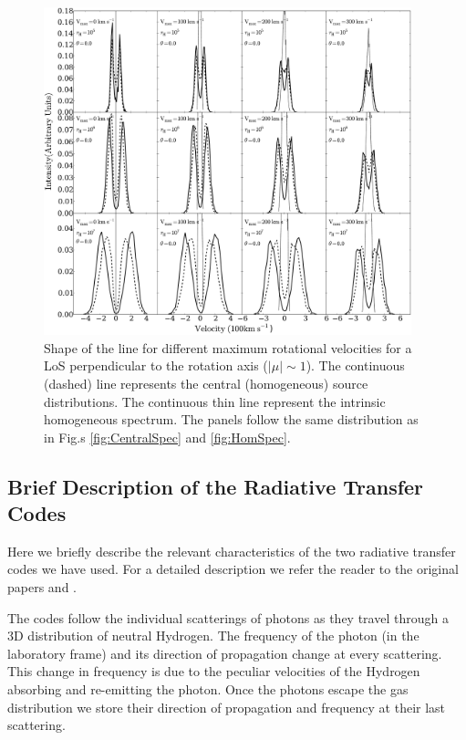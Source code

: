 \documentclass{emulateapj}
\newcommand{\ly}{{\ifmmode{{\rm Ly}\alpha~}\else{Ly$\alpha$~}\fi}}
\begin{document}
\begin{figure}
\begin{center}
  \includegraphics[width=0.95\textwidth]{f4-2.pdf}
\end{center}
\caption{Shape of the \ly line for different maximum rotational
  velocities for a LoS perpendicular to the rotation axis
  ($|\mu|\sim 1$). The continuous (dashed) line represents the central
  (homogeneous) source distributions.  The continuous thin line
represent the intrinsic homogeneous spectrum. The panels follow the same
  distribution as in Fig.s \ref{fig:CentralSpec} and \ref{fig:HomSpec}.
    \label{fig:differentvelocities2}}
\end{figure}


\subsection{Brief Description of the Radiative Transfer Codes}

Here we briefly describe the relevant characteristics of the two
radiative transfer codes we have used.  
For a detailed description we refer the reader to the original papers
\cite{CLARA} and \cite{DijkstraKramer}. 

The codes follow the individual scatterings of \ly photons as they
travel through a 3D distribution of neutral Hydrogen. 
The frequency of the photon (in the laboratory frame) and
its direction of propagation change at every scattering. 
This change in frequency is due to the peculiar velocities of the
Hydrogen absorbing and re-emitting the photon. 
Once the photons escape the gas distribution we store their direction of
propagation and frequency at their last scattering.
\end{document}
